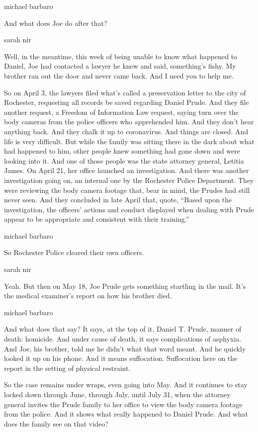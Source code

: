 michael barbaro

And what does Joe do after that?

sarah nir

Well, in the meantime, this week of being unable to know what happened
to Daniel, Joe had contacted a lawyer he knew and said, something's
fishy. My brother ran out the door and never came back. And I need you
to help me.

So on April 3, the lawyers filed what's called a preservation letter to
the city of Rochester, requesting all records be saved regarding Daniel
Prude. And they file another request, a Freedom of Information Law
request, saying turn over the body cameras from the police officers who
apprehended him. And they don't hear anything back. And they chalk it up
to coronavirus. And things are closed. And life is very difficult. But
while the family was sitting there in the dark about what had happened
to him, other people knew something had gone down and were looking into
it. And one of those people was the state attorney general, Letitia
James. On April 21, her office launched an investigation. And there was
another investigation going on, an internal one by the Rochester Police
Department. They were reviewing the body camera footage that, bear in
mind, the Prudes had still never seen. And they concluded in late April
that, quote, ``Based upon the investigation, the officers' actions and
conduct displayed when dealing with Prude appear to be appropriate and
consistent with their training.''

michael barbaro

So Rochester Police cleared their own officers.

sarah nir

Yeah. But then on May 18, Joe Prude gets something startling in the
mail. It's the medical examiner's report on how his brother died.

michael barbaro

And what does that say? It says, at the top of it, Daniel T. Prude,
manner of death: homicide. And under cause of death, it says
complications of asphyxia. And Joe, his brother, told me he didn't what
that word meant. And he quickly looked it up on his phone. And it means
suffocation. Suffocation here on the report in the setting of physical
restraint.

So the case remains under wraps, even going into May. And it continues
to stay locked down through June, through July, until July 31, when the
attorney general invites the Prude family to her office to view the body
camera footage from the police. And it shows what really happened to
Daniel Prude. And what does the family see on that video?

